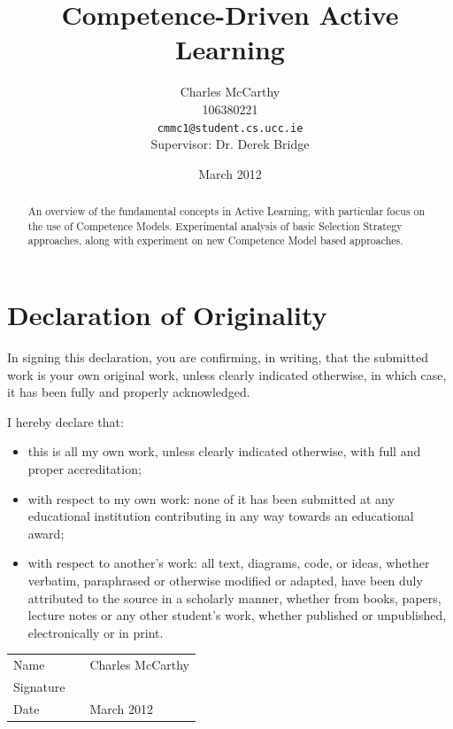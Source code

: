 \documentclass[a4paper,11pt]{report}
\title{Competence-Driven Active Learning}
\author{Charles McCarthy\\
  106380221\\
  \texttt{cmmc1@student.cs.ucc.ie}
  \\Supervisor: Dr. Derek Bridge}
\date{March 2012}
\begin{document}
\maketitle

\begin{abstract}
An overview of the fundamental concepts in Active Learning, with particular focus on the use of Competence Models. Experimental analysis of basic Selection Strategy approaches, along with experiment on new Competence Model based approaches.
\end{abstract}

\chapter*{Declaration of Originality}
\vspace*{\fill}
In signing this declaration, you are confirming, in writing, that the submitted work is your own original work, unless clearly indicated otherwise, in which case, it has been fully and properly acknowledged.

I hereby declare that:
\begin{itemize}
	\item this is all my own work, unless clearly indicated otherwise, with full and proper accreditation;
	\item with respect to my own work: none of it has been submitted at any educational institution contributing in any way towards an educational award;
	\item with respect to another's work: all text, diagrams, code, or ideas, whether verbatim, paraphrased or otherwise modified or adapted, have been duly attributed to the source in a scholarly manner, whether from books, papers, lecture notes or any other student's work, whether published or unpublished, electronically or in print. 
\end{itemize}

{
\renewcommand{\arraystretch}{4.5}
\begin{center}
 	\begin{tabular}{l @{:} p{0.4in} l}
		Name & & Charles McCarthy \\
		Signature & & \makebox[2.5in]{\hrulefill} \\
		Date & & March 2012 \\
	\end{tabular}
\end{center}
}
\vspace{\fill}
\end{document}
